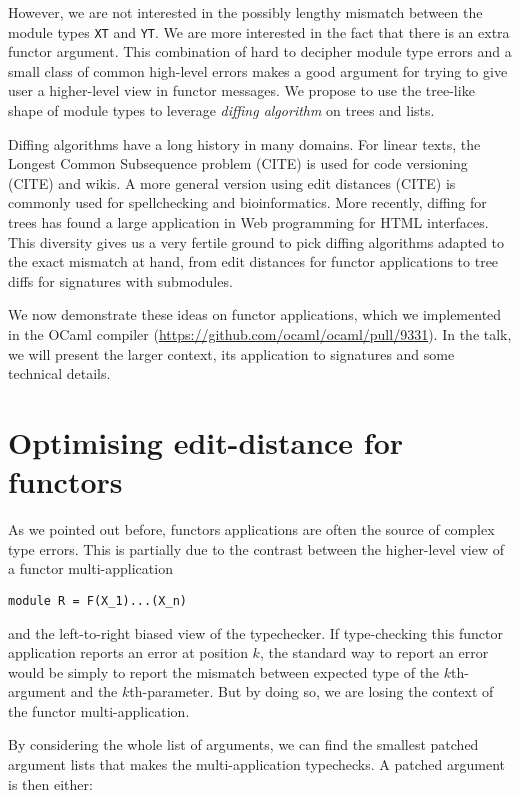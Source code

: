 \documentclass[a4paper,11pt]{scrartcl}
\begin{document}
However, we are not interested in the possibly lengthy mismatch between the module types \texttt{XT} and
\texttt{YT}. We are more interested in the fact that there is an extra functor argument.
%
This combination of hard to decipher module type errors and a small class of common high-level errors makes
a good argument for trying to give user a higher-level view in functor messages.
We propose to use the tree-like shape of module types to leverage
\emph{diffing algorithm} on trees and lists.

Diffing algorithms have a long history in many domains. For linear texts, the
Longest Common Subsequence problem (CITE) is used for code versioning (CITE) and wikis. A more general version
using edit distances (CITE) is commonly used for spellchecking and bioinformatics.
More recently, diffing for trees has found a large application
in Web programming for HTML interfaces. This diversity gives
us a very fertile ground to pick diffing algorithms adapted to the exact
mismatch at hand, from edit distances for functor applications to
tree diffs for signatures with submodules.

We now demonstrate these ideas on functor applications, which
we implemented in the OCaml compiler
(\url{https://github.com/ocaml/ocaml/pull/9331}).
In the talk, we will present the larger context, its application to signatures
and some technical details.

\section{Optimising edit-distance for functors}

As we pointed out before, functors applications are often the source
of complex type errors. This is partially due to the contrast between the higher-level view of a functor multi-application

\begin{verbatim}
module R = F(X_1)...(X_n)
\end{verbatim}

and the left-to-right biased view of the typechecker.
If type-checking this functor application reports an error at position $k$, the standard
way to report an error would be simply to report the mismatch between expected type of
the $k$th-argument and the $k$th-parameter. But by doing so, we are losing the context of the
functor multi-application.

By considering the whole list of arguments, we can find the smallest patched
argument lists that makes the multi-application typechecks. A patched argument is then either:
\end{document}
